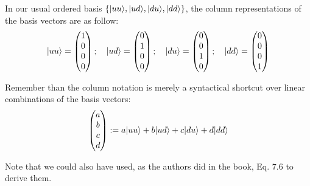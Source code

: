 \documentclass[solutions.tex]{subfiles}
\begin{document}
In our usual ordered basis $\{ |uu\rangle, |ud\rangle, |du\rangle, |dd\rangle \}$,
the column representations of the basis vectors are as follow:
\[
	|uu\rangle = \begin{pmatrix}
		1 \\
		0 \\
		0 \\
		0 \\
	\end{pmatrix};\quad
	|ud\rangle = \begin{pmatrix}
		0 \\
		1 \\
		0 \\
		0 \\
	\end{pmatrix};\quad
	|du\rangle = \begin{pmatrix}
		0 \\
		0 \\
		1 \\
		0 \\
	\end{pmatrix};\quad
	|dd\rangle = \begin{pmatrix}
		0 \\
		0 \\
		0 \\
		1 \\
	\end{pmatrix}
\]
\begin{remark} Remember than the column notation is merely a syntactical
shortcut over linear combinations of the basis vectors:
\[
	\begin{pmatrix}
		a \\
		b \\
		c \\
		d \\
	\end{pmatrix} := a|uu\rangle + b|ud\rangle + c|du\rangle + d|dd\rangle
\]
\end{remark}
\begin{remark} Note that we could also have used, as the authors did
in the book, Eq. $7.6$ to derive them.
\end{remark}
\end{document}
